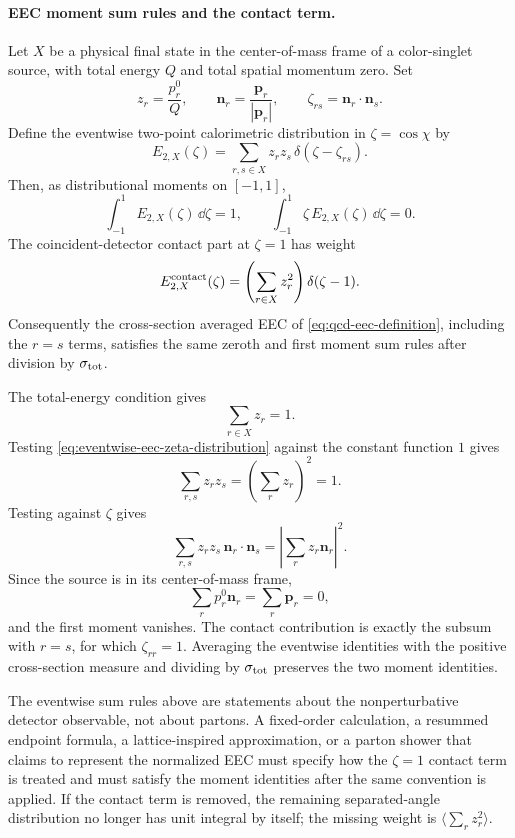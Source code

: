 \paragraph{EEC moment sum rules and the contact term.}
Let \(X\) be a physical final state in the center-of-mass frame of a
color-singlet source, with total energy \(Q\) and total spatial momentum zero.
Set
\[
  z_r=\frac{p_r^0}{Q},
  \qquad
  \mathbf n_r=\frac{\mathbf p_r}{|\mathbf p_r|},
  \qquad
  \zeta_{rs}=\mathbf n_r\cdot\mathbf n_s .
\]
Define the eventwise two-point calorimetric distribution in
\(\zeta=\cos\chi\) by
\begin{equation}
  E_{2,X}(\zeta)
  =
  \sum_{r,s\in X}z_r z_s\,\delta(\zeta-\zeta_{rs}) .
  \label{eq:eventwise-eec-zeta-distribution}
\end{equation}
Then, as distributional moments on \([-1,1]\),
\begin{equation}
  \int_{-1}^{1} E_{2,X}(\zeta)\,\dd\zeta=1,
  \qquad
  \int_{-1}^{1}\zeta\,E_{2,X}(\zeta)\,\dd\zeta=0 .
  \label{eq:eventwise-eec-first-sum-rules}
\end{equation}
The coincident-detector contact part at \(\zeta=1\) has weight
\begin{equation}
  E_{2,X}^{\rm contact}(\zeta)
  =
  \left(\sum_{r\in X}z_r^2\right)\delta(\zeta-1).
  \label{eq:eventwise-eec-contact-weight}
\end{equation}
Consequently the cross-section averaged EEC of
\eqref{eq:qcd-eec-definition}, including the \(r=s\) terms, satisfies the same
zeroth and first moment sum rules after division by \(\sigma_{\rm tot}\).

The total-energy condition gives
\[
  \sum_{r\in X}z_r=1.
\]
Testing \eqref{eq:eventwise-eec-zeta-distribution} against the constant
function \(1\) gives
\[
  \sum_{r,s}z_rz_s
  =
  \left(\sum_r z_r\right)^2
  =
  1.
\]
Testing against \(\zeta\) gives
\[
  \sum_{r,s}z_rz_s\,\mathbf n_r\cdot\mathbf n_s
  =
  \left|\sum_r z_r\mathbf n_r\right|^2.
\]
Since the source is in its center-of-mass frame,
\[
  \sum_r p_r^0\mathbf n_r=\sum_r\mathbf p_r=0,
\]
and the first moment vanishes.  The contact contribution is exactly the
subsum with \(r=s\), for which \(\zeta_{rr}=1\).  Averaging the eventwise
identities with the positive cross-section measure and dividing by
\(\sigma_{\rm tot}\) preserves the two moment identities.

\begin{remark}
\label{rem:eec-sum-rules-use}
The eventwise sum rules above are statements about the nonperturbative
detector observable, not about partons.  A fixed-order
calculation, a resummed endpoint formula, a lattice-inspired approximation, or
a parton shower that claims to represent the normalized EEC must specify how
the \(\zeta=1\) contact term is treated and must satisfy the moment identities
after the same convention is applied.  If the contact term is removed, the
remaining separated-angle distribution no longer has unit integral by itself;
the missing weight is \(\langle\sum_r z_r^2\rangle\).
\end{remark}

